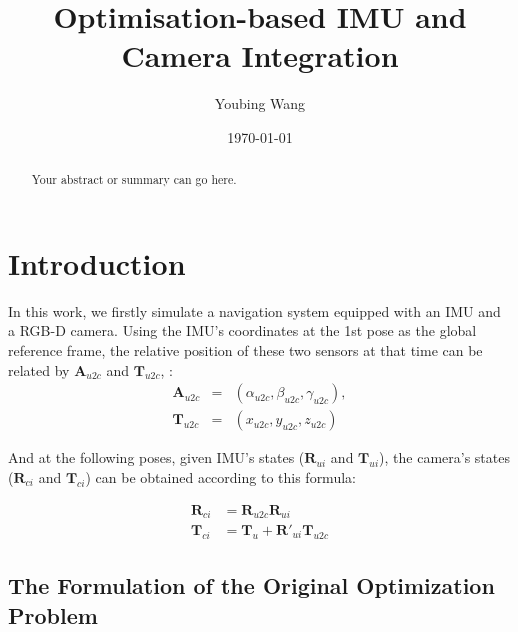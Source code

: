\documentclass[12pt]{article}   %
\begin{document}


\title{Optimisation-based IMU and Camera Integration}
\author{Youbing Wang}
\date{\today}

\maketitle

\begin{abstract}
Your abstract or summary can go here.
\end{abstract}

\newpage

\tableofcontents

\newpage

\section{Introduction}

\vspace{1cm}
In this work, we firstly simulate a navigation system equipped with an IMU and a RGB-D camera. Using the IMU's coordinates at the 1st pose as the global reference frame, the relative position of these two sensors at that time can be related by $\textbf{A}_{u2c}$ and $\textbf{T}_{u2c}$, : 
\begin{eqnarray*}   %
\textbf{A}_{u2c} & = & (\alpha_{u2c}, \beta_{u2c}, \gamma_{u2c}), \\
\textbf{T}_{u2c} & = & (x_{u2c}, y_{u2c}, z_{u2c})
\end{eqnarray*}

And at the following poses, given IMU's states ($\textbf{R}_{ui}$ and $\textbf{T}_{ui}$), the camera's states ($\textbf{R}_{ci}$ and $\textbf{T}_{ci}$) can be obtained according to this formula:

\begin{align*}
\textbf{R}_{ci} &= \textbf{R}_{u2c} \textbf{R}_{ui} \\
\textbf{T}_{ci} &= \textbf{T}_{u} + \textbf{R}'_{ui} \textbf{T}_{u2c}  %
 \end{align*} 

\subsection{The Formulation of the Original Optimization Problem}
\end{document}
